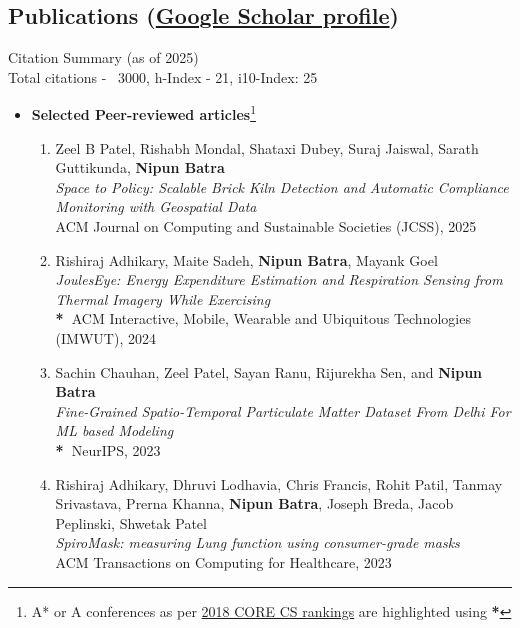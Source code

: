 \documentclass[letter,10pt]{article}
\begin{document}
\subsection*{\textbf{Publications} (\href{https://scholar.google.com/citations?user=rFGzHlIAAAAJ&hl=en}{Google Scholar profile})}
\vspace{-0.4em}

Citation Summary (as of 2025)\\ 
Total citations - ~3000, h-Index - 21, i10-Index: 25

\begin{itemize}
    \item[]\textbf{Selected Peer-reviewed articles}\footnote{A* or A conferences as per \href{http://portal.core.edu.au/conf-ranks/} {2018 CORE CS rankings} are highlighted using \textbf{*}}  
    \begin{enumerate}

    \item{Zeel B Patel, Rishabh Mondal, Shataxi Dubey, Suraj Jaiswal, Sarath Guttikunda, \textbf{Nipun Batra}}\\
    \textit{Space to Policy: Scalable Brick Kiln Detection and Automatic Compliance Monitoring with Geospatial Data}\\
    {ACM Journal on Computing and Sustainable Societies (JCSS), 2025}

    \item{Rishiraj Adhikary, Maite Sadeh, \textbf{Nipun Batra}, Mayank Goel}\\
    \textit{JoulesEye: Energy Expenditure Estimation and Respiration Sensing from Thermal Imagery While Exercising}\\
      \textbf{*~}{ACM Interactive, Mobile, Wearable and Ubiquitous Technologies (IMWUT), 2024}

    \item{Sachin Chauhan, Zeel Patel, Sayan Ranu, Rijurekha Sen, and \textbf{Nipun Batra}}\\
    \textit{Fine-Grained Spatio-Temporal Particulate Matter Dataset From Delhi For ML based Modeling}\\
    \textbf{*~}{NeurIPS, 2023}

    \item{Rishiraj Adhikary, Dhruvi Lodhavia, Chris Francis, Rohit Patil, Tanmay Srivastava, Prerna Khanna, \textbf{Nipun Batra}, Joseph Breda, Jacob Peplinski, Shwetak Patel}\\
    \textit{SpiroMask: measuring Lung function using consumer-grade masks}\\
      {ACM Transactions on Computing for Healthcare, 2023}


\end{enumerate}
\end{itemize}
\end{document}
